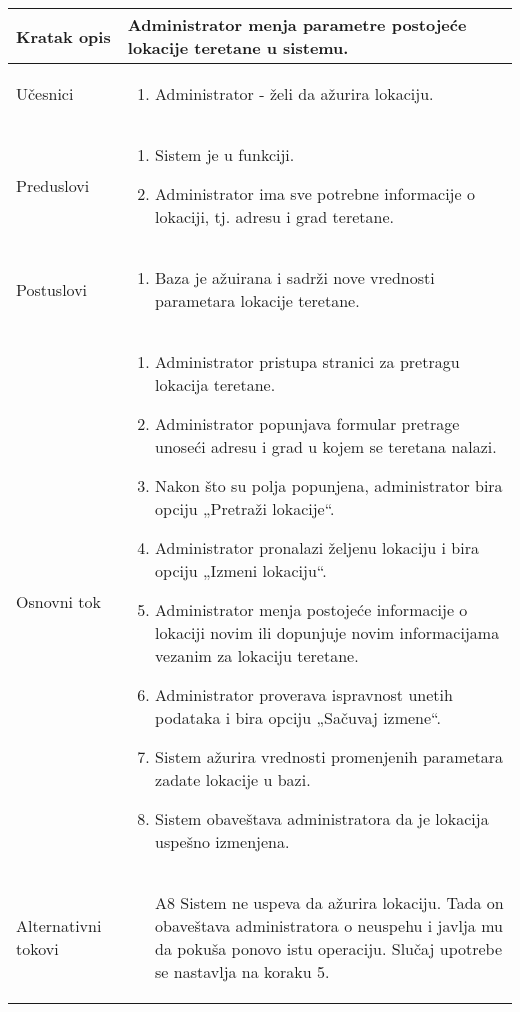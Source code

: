 \documentclass[../main.tex]{subfiles}
\begin{document}
\begin{longtable}{| p{} | p{} |} 

\hline
    Kratak opis &  Administrator menja parametre postojeće lokacije teretane u sistemu.\\ 
\hline    
    Učesnici & 
    	\begin{enumerate}
        \item Administrator - želi da ažurira lokaciju.
     \end{enumerate}\\
\hline
   Preduslovi & \begin{enumerate}
       \item Sistem je u funkciji.
       \item Administrator ima sve potrebne informacije o lokaciji, tj. adresu i grad teretane.
   \end{enumerate}\\
\hline  
    Postuslovi & \begin{enumerate}
        \item Baza je ažuirana i sadrži nove vrednosti parametara lokacije teretane.
    \end{enumerate}\\
\hline
    Osnovni tok & \begin{enumerate}
        \item Administrator pristupa stranici za pretragu lokacija teretane.
        \item Administrator popunjava formular pretrage unoseći adresu i grad u kojem se teretana nalazi.
        \item Nakon što su polja popunjena, administrator bira opciju „Pretraži lokacije“.
        \item Administrator pronalazi željenu lokaciju i bira opciju „Izmeni lokaciju“.
        \item Administrator menja postojeće informacije o lokaciji novim ili dopunjuje novim informacijama vezanim za lokaciju teretane.
        \item Administrator proverava ispravnost unetih podataka i bira opciju „Sačuvaj izmene“.
        \item Sistem ažurira vrednosti promenjenih parametara zadate lokacije u bazi.
        \item Sistem obaveštava administratora da je lokacija uspešno izmenjena.
    \end{enumerate}\\
\hline
    Alternativni tokovi & \begin{itemize}
        \item[A8]  Sistem ne uspeva da ažurira lokaciju. Tada on obaveštava administratora o neuspehu i javlja mu da pokuša ponovo istu operaciju. Slučaj upotrebe se nastavlja na koraku 5.


\end{itemize}
\end{longtable}
\end{document}
